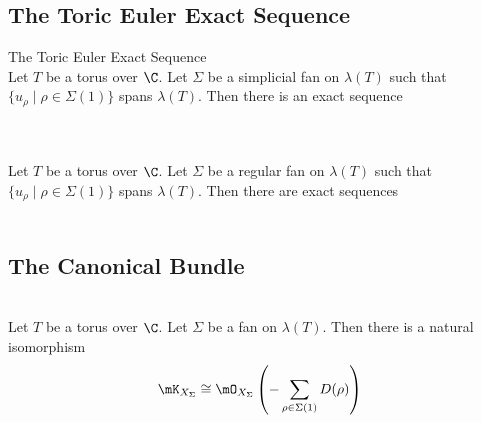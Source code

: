 \documentclass[a4paper]{article}
\begin{document}
\subsection{The Toric Euler Exact Sequence}
\begin{thm}{The Toric Euler Exact Sequence}{}\\
Let $T$ be a torus over $\C$. Let $\Sigma$ be a simplicial fan on $\lambda(T)$ such that $\{u_\rho\;|\;\rho\in\Sigma(1)\}$ spans $\lambda(T)$. Then there is an exact sequence \\
\\
\end{thm}

\begin{crl}{}{}\\
Let $T$ be a torus over $\C$. Let $\Sigma$ be a regular fan on $\lambda(T)$ such that $\{u_\rho\;|\;\rho\in\Sigma(1)\}$ spans $\lambda(T)$. Then there are exact sequences \\
\\
\end{crl}

\subsection{The Canonical Bundle}
\begin{prp}{}{}\\
Let $T$ be a torus over $\C$. Let $\Sigma$ be a fan on $\lambda(T)$. Then there is a natural isomorphism $$\mK_{X_\Sigma}\cong\mO_{X_\Sigma}\left(-\sum_{\rho\in\Sigma(1)}D(\rho)\right)$$
\end{prp}
\end{document}
